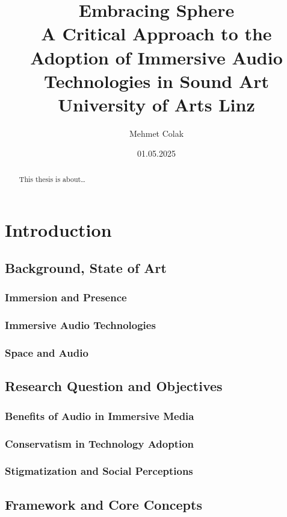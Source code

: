 \documentclass[a4paper, 12pt]{report}
\author{Mehmet Colak}
\title{Embracing Sphere \\[1ex] 
\Large A Critical Approach to the Adoption of Immersive Audio Technologies in Sound Art \\[3ex]
\large University of Arts Linz}
\date{01.05.2025}
\begin{document}
\maketitle
\tableofcontents
\listoffigures
\listoftables

\begin{abstract}
    This thesis is about\ldots
\end{abstract}

\newpage



\chapter{Introduction}
    \section{Background, State of Art}
        \subsection{Immersion and Presence}
        \subsection{Immersive Audio Technologies}
        \subsection{Space and Audio}
    \section{Research Question and Objectives}
        \subsection{Benefits of Audio in Immersive Media}
        \subsection{Conservatism in Technology Adoption}
        \subsection{Stigmatization and Social Perceptions}
    \section{Framework and Core Concepts}
\end{document}
